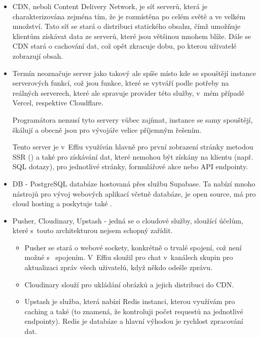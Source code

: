 \documentclass[12pt, a4paper,
openright
]{report}
\begin{document}
	\begin{itemize}
		\item CDN, neboli Content Delivery Network, je síť serverů, která je charakterizována zejména tím, že je rozmístěna po celém světě a ve velkém množství. Tato síť se stará o distribuci statického obsahu, čímž umožňuje klientům získávat data ze serverů, které jsou většinou mnohem blíže. Dále se CDN stará o cachování dat, což opět zkracuje dobu, po kterou uživatelé zobrazují obsah.
		\item Termín  neoznačuje server jako takový ale spíše místo kde se spouštějí instance serverových funkcí, což jsou funkce, které se vytváří podle potřeby na reálných serverech, které ale spravuje provider této služby, v~mém případě Vercel, respektive Cloudflare.
		
		Programátora nemusí tyto servery vůbec zajímat, instance se samy spouštějí, škálují a obecně jsou pro vývojáře velice příjemným řešením.
		
		Tento server je v~Effiu využíván hlavně pro první zobrazení stránky metodou SSR () a také pro získávání dat, které nemohou být získány na klientu (např. SQL dotazy), pro jednotlivé stránky, formulářové akce nebo API endpointy.
		
		\item DB - PostgreSQL databáze hostovaná přes službu Supabase. Ta nabízí mnoho nástrojů pro vývoj webových aplikací včetně databáze, je open source, má  pro cloud hosting a poskytuje také .
		\item Pusher, Cloudinary, Upstash - jedná se o cloudové služby, sloužící účelům, které s~touto architekturou nejsem schopný zařídit.

		\begin{itemize}
			\item Pusher se stará o webové sockety, konkrétně o trvalé spojení, což není možné s~ spojením. V~Effiu sloužil pro chat v~kanálech skupin pro aktualizaci zpráv všech uživatelů, když někdo odešle zprávu.
			
			\item Cloudinary slouží pro ukládání obrázků a jejich distribuci do CDN.
			
			\item Upstash je služba, která nabízí Redis instanci, kterou využívám pro caching a také  (to znamená, že kontroluji počet requestů na jednotlivé endpointy). Redis je  databáze a hlavní výhodou je rychlost zpracování dat.
		\end{itemize}
	\end{itemize}
\end{document}
